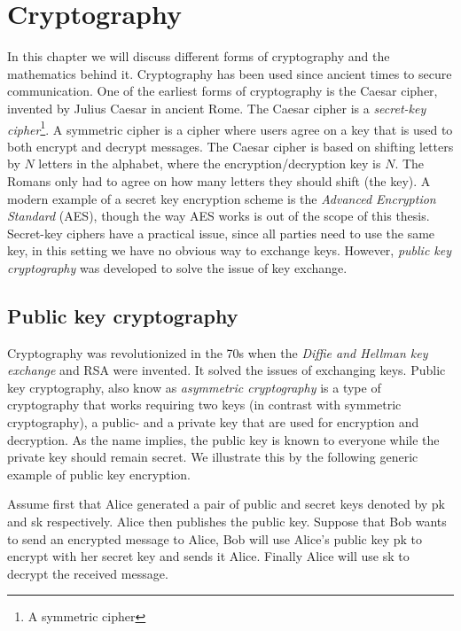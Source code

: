 \chapter{Cryptography\label{crypto}}
In this chapter we will discuss different forms of cryptography and the
mathematics behind it. Cryptography has been used since ancient times to secure
communication. One of the earliest forms of cryptography is the Caesar cipher,
invented by Julius Caesar in ancient Rome. The Caesar cipher is a
\textit{secret-key cipher}\footnote{A symmetric cipher}. A symmetric cipher is
a cipher where users agree on a key that is used to both encrypt and decrypt
messages. The Caesar cipher is based on shifting letters by $N$ letters in the
alphabet, where the encryption/decryption key is $N$. The Romans only had to
agree on how many letters they should shift (the key). A modern example of a
secret key encryption scheme is the \textit{Advanced Encryption Standard}
(AES), though the way AES works is out of the scope of this thesis. Secret-key
ciphers have a practical issue, since all parties need to use the same key, in
this setting we have no obvious way to exchange keys. However, \textit{public
key cryptography} was developed to solve the issue of key exchange.


\section{Public key cryptography}
Cryptography was revolutionized in the 70s when the \textit{Diffie and Hellman
key exchange} and RSA were invented. It solved the issues of exchanging keys.
Public key cryptography, also know as \textit{asymmetric cryptography}
is a type of cryptography that works requiring two keys (in contrast with
symmetric cryptography), a public- and a private key that are used for
encryption and decryption. As the name implies, the public key is known to
everyone while the private key should remain secret. We illustrate this by the
following generic example of public key encryption.

\begin{example}
    Assume first that Alice generated a pair of public and secret keys denoted
    by pk and sk respectively. Alice then publishes the public key. Suppose that
    Bob wants to send an encrypted message to Alice, Bob will use Alice's
    public key pk to encrypt with her secret key and sends it Alice. Finally
    Alice will use sk to decrypt the received message.
\end{example}

